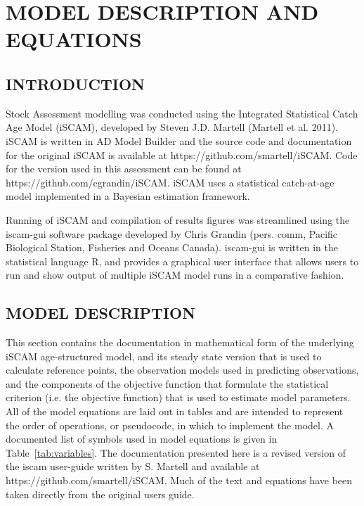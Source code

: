
\def\beq{\vspace{-5ex} \begin{fleqn} \begin{equation}}
\def\eeq{\end{equation} \end{fleqn} \vspace{-5ex}}
\def\tabline{\vspace{2ex} \hrule \vspace{2ex}}
\def\newp{\vfill \break}

\clearpage

\chapter{MODEL DESCRIPTION AND EQUATIONS}
\label{chap:equations}

\section{INTRODUCTION}

Stock Assessment modelling was conducted using the Integrated Statistical Catch Age Model (iSCAM), developed by Steven J.D. Martell (Martell et al. 2011).  iSCAM is written in AD Model Builder and the source code and documentation for the original iSCAM is available at https://github.com/smartell/iSCAM. Code for the version used in this assessment can be found at https://github.com/cgrandin/iSCAM. iSCAM uses a statistical catch-at-age model implemented in a Bayesian estimation framework.

Running of iSCAM and compilation of results figures was streamlined using the iscam-gui software package developed by Chris Grandin (pers. comm, Pacific Biological Station, Fisheries and Oceans Canada). iscam-gui is written in the statistical language R, and provides a graphical user interface that allows users to run and show output of multiple iSCAM model runs in a comparative fashion.

\section{MODEL DESCRIPTION}

This section contains the documentation in mathematical form of the underlying iSCAM age-structured model, and its steady state version that is used to calculate reference points, the observation models used in predicting observations, and the components of the objective function that formulate the statistical criterion (i.e. the objective function) that is used to estimate model parameters. All of the model equations are laid out in tables and are intended to represent the order of operations, or pseudocode, in which to implement the model. A documented list of symbols used in model equations is given in Table~\ref{tab:variables}. The documentation presented here is a revised version of the iscam user-guide written by S. Martell and available at https://github.com/smartell/iSCAM. Much of the text and equations have been taken directly from the original users guide.

